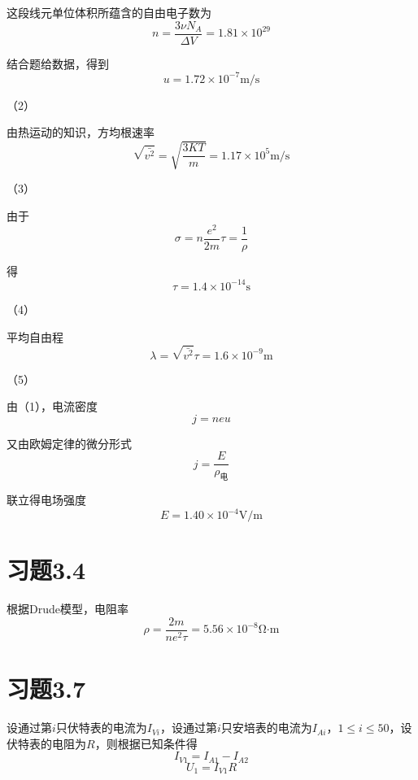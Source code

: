 \documentclass{SCIS2020cn}
\begin{document}
这段线元单位体积所蕴含的自由电子数为
\begin{equation}
    n=\frac{3\nu{}N_A}{\Delta{}V}=1.81×10^{29}
\end{equation}

结合题给数据，得到
\begin{equation}
    u=1.72×10^{-7}\text{m/s}
\end{equation}

（2）

由热运动的知识，方均根速率
\begin{equation}
    \sqrt{\bar{v^2}}=\sqrt{\frac{3KT}{m}}=1.17×10^5\text{m/s}
\end{equation}

（3）

由于
\begin{equation}
    \sigma=n\frac{e^2}{2m}\tau=\frac{1}{\rho}
\end{equation}


得
\begin{equation}
    \tau=1.4×10^{-14}\text{s}
\end{equation}

（4）

平均自由程
\begin{equation}
    \lambda=\sqrt{\bar{v^2}}\tau=1.6×10^{-9}\text{m}
\end{equation}

（5）

由（1），电流密度
\begin{equation}
    j=neu
\end{equation}

又由欧姆定律的微分形式
\begin{equation}
    j=\frac{E}{\rho_{\text{电}}}
\end{equation}

联立得电场强度
\begin{equation}
    E=1.40×10^{-4}\text{V/m}
\end{equation}

\section{习题3.4}
根据Drude模型，电阻率
\begin{equation}
    \rho=\frac{2m}{ne^2\tau}=5.56×10^{-8}\text{Ω·m}
\end{equation}

\section{习题3.7}
设通过第$i$只伏特表的电流为$I_{Vi}$，设通过第$i$只安培表的电流为$I_{Ai}$，$1\leqslant{}i\leqslant50$，设伏特表的电阻为$R$，则根据已知条件得
\begin{equation}
    I_{V1}=I_{A1}-I_{A2}
\end{equation}
\begin{equation}
    U_1=I_{V1}R
\end{equation}
\end{document}

